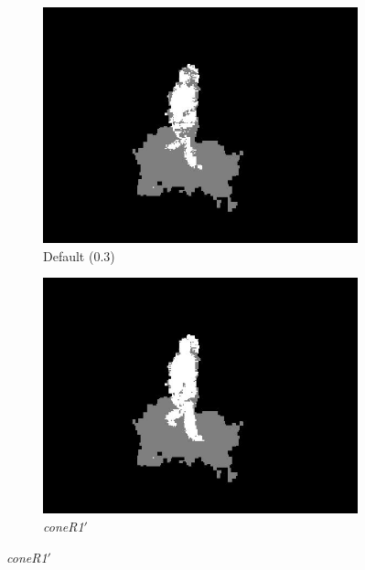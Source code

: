 \begin{figure}
  \hfill
  \begin{subfigure}{.32\linewidth}
  \includegraphics[width=1\linewidth]{figures/model/room_0275_default.jpg}
  \caption{Default (0.3)}
  \end{subfigure}
  \hfill
  \begin{subfigure}{.32\linewidth}
  \includegraphics[width=1\linewidth]{figures/model/room_0275_calc.jpg}
  \caption{\textit{coneR1}$'$}
  \end{subfigure}
  
\label{fig:qual_results}
\end{figure} 


